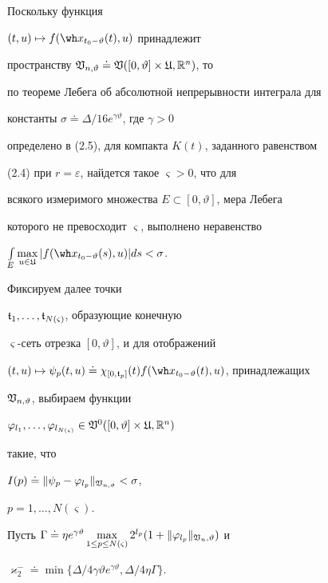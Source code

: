 \begin{pf}


Поскольку функция


$(t,u)\mapsto f(\wh x_{t_0-\vartheta}(t),u)$ принадлежит


пространству $\frak V_{n,\vartheta}


\doteq\frak V([0,\vartheta]\times\frak U,\bR^n)$, то


по теореме Лебега об абсолютной непрерывности интеграла для


константы $\sigma\doteq\Delta/16e^{\gamma\vartheta}$, где $\gamma>0$


определено в (2.5), для компакта $K(t)$, заданного равенством


(2.4) при $r=\varepsilon$, найдется такое $\varsigma>0$, что для


всякого измеримого множества $E\subset[0,\vartheta ]$, мера Лебега


которого не превосходит $\varsigma$, выполнено неравенство


$\int\limits_E\max\limits_{u\in\frak U}


|f(\wh x_{t_0-\vartheta}(s),u)|ds<\sigma$.


Фиксируем далее точки


$\frak t_1,\dotsc,\frak t_{N(\varsigma)}$, образующие конечную


$\varsigma$-сеть отрезка $[0,\vartheta]$, и для отображений


$(t,u)\mapsto\psi_p(t,u)\doteq\chi_{[0,\frak t_p]}(t)


f(\wh x_{t_0-\vartheta }(t),u)$, принадлежащих


$\frak V_{n,\vartheta}$, выбираем функции


$\varphi_{l_1},\dotsc,\varphi_{l_{N(\varsigma)}}


\in\frak V^0([0,\vartheta]\times\frak U,\bR^n)$


такие, что


$I(p)\doteq\|\psi_p-\varphi_{l_{p}}\|_{\frak V_{n,\vartheta}}<\sigma$,


$p=1,\dotsc,N(\varsigma)$.


Пусть $\Gamma\doteq\eta e^{\gamma\vartheta}


\max\limits_{1\le p\le N(\varsigma)}


2^{l_p}(1+\|\varphi_{l_p}\|_{\frak V_n,\vartheta})$ и


$\varkappa_2^-\doteq\min\{\Delta/4\gamma\vartheta e^{\gamma


\vartheta},\Delta/4\eta\Gamma\}$.



\end{pf}
